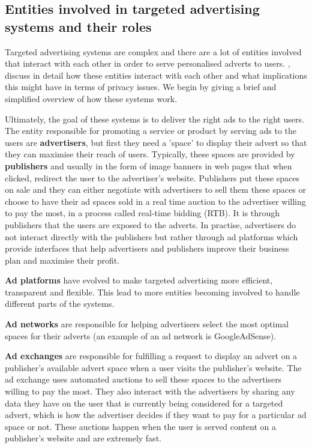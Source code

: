 \documentclass{l4proj}
\begin{document}
\subsection{Entities involved in targeted advertising systems and their roles}
Targeted advertising systems are complex and there are a lot of entities involved that interact with each other in order to serve personalised adverts to users. \cite{Estrada-Jimenez2017}, discuss in detail how these entities interact with each other and what implications this might have in terms of privacy issues. We begin by giving a brief and simplified overview of how these systems work. 

Ultimately, the goal of these systems is to deliver the right ads to the right users. The entity responsible for promoting a service or product by serving ads to the users are \textbf{advertisers}, but first they need a 'space' to display their advert so that they can maximise their reach of users. Typically, these spaces are provided by \textbf{publishers} and usually in the form of image banners in web pages that when clicked, redirect the user to the advertiser's website. Publishers put these spaces on sale and they can either negotiate with advertisers to sell them these spaces or choose to have their ad spaces sold in a real time auction to the advertiser willing to pay the most, in a process called real-time bidding (RTB). It is through publishers that the users are exposed to the adverts. In practise, advertisers do not interact directly with the publishers but rather through ad platforms which provide interfaces that help advertisers and publishers improve their business plan and maximise their profit.

\textbf{Ad platforms} have evolved to make targeted advertising more efficient, transparent and flexible. This lead to more entities becoming involved to handle different parts of the systems. 

\textbf{Ad networks} are responsible for helping advertisers select the most optimal spaces for their adverts (an example of an ad network is GoogleAdSense).

\textbf{Ad exchanges} are responsible for fulfilling a request to display an advert on a publisher's available advert space when a user visits the publisher's website. The ad exchange uses automated auctions to sell these spaces to the advertisers willing to pay the most. They also interact with the advertisers by sharing any data they have on the user that is currently being considered for a targeted advert, which is how the advertiser decides if they want to pay for a particular ad space or not. These auctions happen when the user is served content on a publisher's website and are extremely fast.
\end{document}
